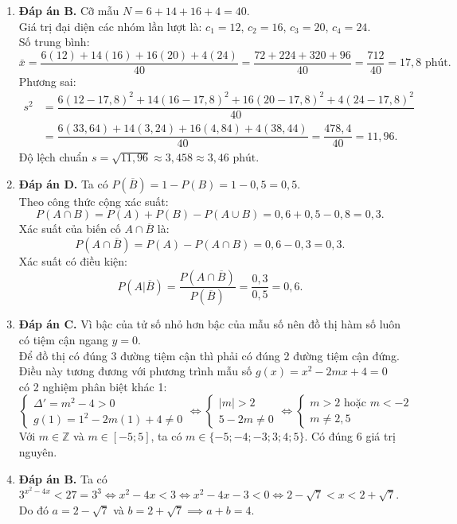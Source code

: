 \documentclass[12pt,a4paper]{article}
\begin{document}
\begin{enumerate}[label=\textbf{Câu \arabic*:}, leftmargin=*]
\item \textbf{Đáp án B.}
Cỡ mẫu $N = 6 + 14 + 16 + 4 = 40$.\\
Giá trị đại diện các nhóm lần lượt là: $c_1 = 12$, $c_2 = 16$, $c_3 = 20$, $c_4 = 24$.\\
Số trung bình:
$$\bar{x} = \dfrac{6(12) + 14(16) + 16(20) + 4(24)}{40} = \dfrac{72 + 224 + 320 + 96}{40} = \dfrac{712}{40} = 17{,}8\text{ phút}.$$
Phương sai:
\begin{align*}
s^2 &= \dfrac{6(12 - 17{,}8)^2 + 14(16 - 17{,}8)^2 + 16(20 - 17{,}8)^2 + 4(24 - 17{,}8)^2}{40} \\
&= \dfrac{6(33{,}64) + 14(3{,}24) + 16(4{,}84) + 4(38{,}44)}{40} = \dfrac{478{,}4}{40} = 11{,}96.
\end{align*}
Độ lệch chuẩn $s = \sqrt{11{,}96} \approx 3{,}458 \approx 3{,}46\text{ phút}$.

\item \textbf{Đáp án D.}
Ta có $P(\overline{B}) = 1 - P(B) = 1 - 0{,}5 = 0{,}5$.\\
Theo công thức cộng xác suất:
$$P(A \cap B) = P(A) + P(B) - P(A \cup B) = 0{,}6 + 0{,}5 - 0{,}8 = 0{,}3.$$
Xác suất của biến cố $A \cap \overline{B}$ là:
$$P(A \cap \overline{B}) = P(A) - P(A \cap B) = 0{,}6 - 0{,}3 = 0{,}3.$$
Xác suất có điều kiện:
$$P(A|\overline{B}) = \dfrac{P(A \cap \overline{B})}{P(\overline{B})} = \dfrac{0{,}3}{0{,}5} = 0{,}6.$$

\item \textbf{Đáp án C.}
Vì bậc của tử số nhỏ hơn bậc của mẫu số nên đồ thị hàm số luôn có tiệm cận ngang $y = 0$.\\
Để đồ thị có đúng 3 đường tiệm cận thì phải có đúng 2 đường tiệm cận đứng.\\
Điều này tương đương với phương trình mẫu số $g(x) = x^2 - 2mx + 4 = 0$ có 2 nghiệm phân biệt khác 1:
$$\begin{cases} \Delta' = m^2 - 4 > 0 \\ g(1) = 1^2 - 2m(1) + 4 \ne 0 \end{cases} \iff \begin{cases} |m| > 2 \\ 5 - 2m \ne 0 \end{cases} \iff \begin{cases} m > 2 \text{ hoặc } m < -2 \\ m \ne 2{,}5 \end{cases}$$
Với $m \in \mathbb{Z}$ và $m \in [-5; 5]$, ta có $m \in \{-5; -4; -3; 3; 4; 5\}$. Có đúng $6$ giá trị nguyên.

\item \textbf{Đáp án B.}
Ta có $3^{x^2 - 4x} < 27 = 3^3 \iff x^2 - 4x < 3 \iff x^2 - 4x - 3 < 0 \iff 2 - \sqrt{7} < x < 2 + \sqrt{7}$.\\
Do đó $a = 2 - \sqrt{7}$ và $b = 2 + \sqrt{7} \implies a + b = 4$.


\end{enumerate}
\end{document}
